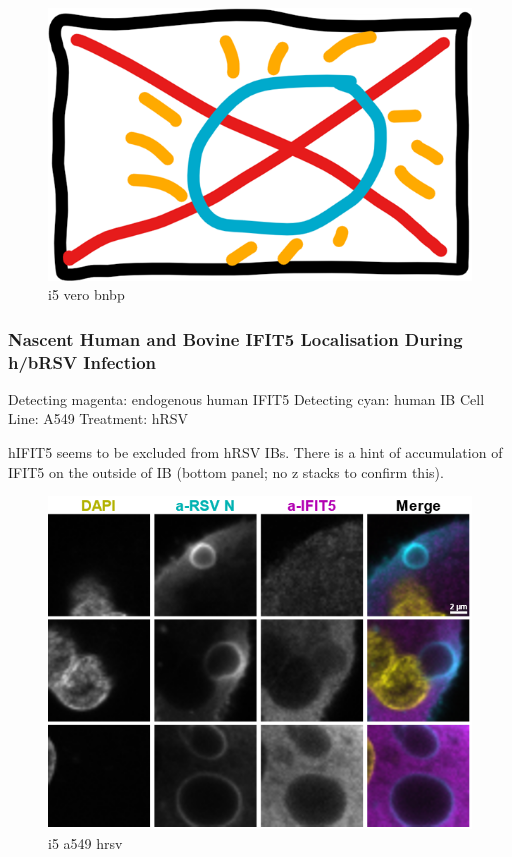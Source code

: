 \begin{figure}
    \centering
    \includegraphics[width=1\linewidth]{06. Chapter 1//Figs/00. placeholder.png}
    \caption[i5 vero bnbp]{i5 vero bnbp}
    \label{i5 vero bnbp}
\end{figure}

\subsubsection{Nascent Human and Bovine IFIT5 Localisation During h/bRSV Infection} \label{Nascent Human and Bovine IFIT5 Localisation During h/bRSV Infection}
 \label{hIFIT5 Localisation During hRSV Infection}
Detecting magenta: endogenous human IFIT5 \newline
Detecting cyan: human IB \newline
Cell Line: A549 \newline
Treatment: hRSV \newline

hIFIT5 seems to be excluded from hRSV IBs. There is a hint of accumulation of IFIT5 on the outside of IB (bottom panel; no z stacks to confirm this). 

\begin{figure}
    \centering
    \includegraphics[width=1\linewidth]{08. Chapter 3/Figs/05. IFIT5/02. a549 hrsv.png}
    \caption[i5 a549 hrsv]{i5 a549 hrsv}
    \label{i5 a549 hrsv}
\end{figure}

